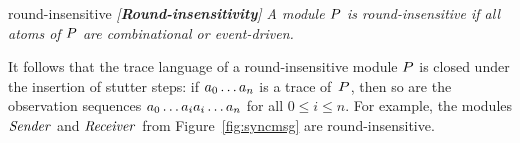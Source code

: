 \begin{definition}{round-insensitive}\it
  {\em [{\bf Round-insensitivity}]}
  A module ${P}$ is {\em round-insensitive\/} if all atoms of ${P}$ are
  combinational or event-driven.
\end{definition}

\mypar
It follows that the trace language of a round-insensitive module ${P}$ is
closed under the insertion of stutter steps:
if $a_0\ldots a_n$ is a trace of~${P}$, then so are the observation
sequences $a_0\ldots a_ia_i\ldots a_n$ for all $0\le i\le n$.
For example, the modules ${\it Sender\/}$ and ${\it Receiver\/}$ from
Figure~\ref{fig:syncmsg} are round-insensitive.


